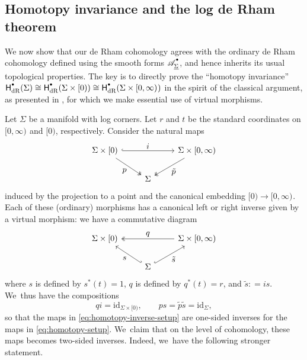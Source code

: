 \documentclass[JEP,XML,SOM,Unicode,NoFloatCountersInSection,published]{cedram}
\let\oldbullet\bullet
\renewcommand{\bullet}{{\raisebox{1pt}{$\scriptscriptstyle\oldbullet$}}}
\let\tst\textstyle
\theoremstyle{definition}
\theoremstyle{remark}
\newcommand{\halfspc}[1]{[0,\infty)^{#1}}
\newcommand{\id}[1]{\mathrm{id}_{#1}}
\newcommand{\tp}{\tilde p}
\newcommand{\ts}{\tilde s}
\newcommand{\defas}{\mathrel{\mathop:}=}
\newcommand{\rbrac}[1]{\left(#1\right)}
\newcommand{\cA}[2][\bullet]{\mathscr{A}^{#1}_{#2}}\newcommand{\A}[2][\bullet] {\mathscr{A}^{#1}\rbrac{#2}}
\newcommand{\Sig}{\Sigma}
\newcommand{\uSig}{\underline{\Sigma}}
\newcommand{\HdR}[2][\bullet]{\mathsf{H}_{\mathrm{dR}}^{#1}(#2)}
\begin{document}
\subsection{Homotopy invariance and the log de Rham theorem}\label{sec:poincare}

We now show that our de Rham cohomology agrees with the ordinary de Rham cohomology defined using the smooth forms $\cA{\uSig}$, and hence inherits its usual topological properties. The key is to directly prove the ``homotopy invariance'' $\HdR{\Sig} \cong \HdR{\Sig\times[0)} \cong \HdR{\Sig\times\halfspc{}}$ in the spirit of the classical argument, \eg as presented in \cite[\S{}I.4]{Bott1982}, for which we make essential use of virtual morphisms.

Let $\Sig$ be a manifold with log corners. Let $r$ and $t$ be the standard coordinates on $\halfspc{}$ and $[0)$, respectively. Consider the natural maps\vspace*{-5pt}
\begin{equation}\label{eq:homotopy-setup}
\begin{tikzcd}
\Sig \times [0) \ar[rr,"\tst i",hook]\ar[rd,"\tst p"',twoheadrightarrow] & &\Sig\times \halfspc{} \ar[ld,"\tst \tp",twoheadrightarrow] \\
& \Sig
\end{tikzcd}
\end{equation}
induced by the projection to a point and the canonical embedding $[0) \to \halfspc{}$. Each of these (ordinary) morphisms has a canonical left or right inverse given by a virtual morphism: we have a commutative diagram\vspace*{-5pt}
\begin{equation}
\begin{tikzcd}
\Sig \times [0) & &\Sig\times \halfspc{} \ar[ll,"\tst q"',twoheadrightarrow] \\
& \Sig \ar[ul,"\tst s",hook'] \ar[ur,"\tst \ts"',hook]
\end{tikzcd} \label{eq:homotopy-inverse-setup}
\end{equation}
where $s$ is defined by $s^*(t)=1$, $q$ is defined by $q^*(t)=r$, and $\tilde s\defas is$. We~thus have the compositions\vspace*{-5pt}
\[
q i= \id{\Sig \times [0)},\qquad ps =\tilde p\tilde s = \id{\Sig},
\]
so that the maps in \eqref{eq:homotopy-inverse-setup} are one-sided inverses for the maps in \eqref{eq:homotopy-setup}. We~claim that on the level of cohomology, these maps becomes two-sided inverses. Indeed, we~have the following stronger statement.
\end{document}
